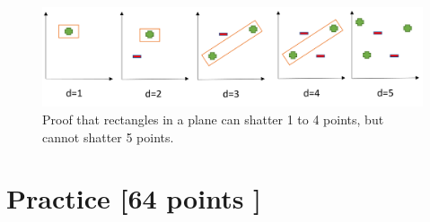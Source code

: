 \documentclass[12pt, fullpage,letterpaper]{article}
\begin{document}
\begin{enumerate}
	\begin{figure}[htp]
        \centering
        \includegraphics[width=14cm]{part1_q6.png}
        \caption{Proof that rectangles in a plane can shatter 1 to 4 points, but cannot shatter 5 points.}
    \end{figure}


\end{enumerate}

\section{Practice [64 points ]}
\end{document}
